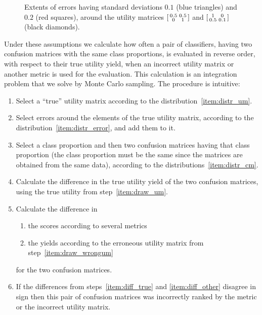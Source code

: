 \documentclass[\ifafour a4paper,12pt,\else a5paper,10pt,\fi%
onecolumn,oneside,article,%
british%
]{memoir}
\theoremstyle{remark}
\theoremstyle{innote}
\renewcommand*{\|}[1][]{\nonscript\:#1\vert\nonscript\:\mathopen{}}
\begin{document}
\begin{figure}[t]
{    \caption{Extents of errors having standard deviations $0.1$ ({\color{mypurpleblue}blue triangles}) and $0.2$ ({\color{myred}red squares}), around the utility matrices $\begin{bsmallmatrix} 0.5&0.5\\0&1 \end{bsmallmatrix}$ and $\begin{bsmallmatrix} 1&0\\0.5&0.1 \end{bsmallmatrix}$ (black diamonds).}
    \label{fig:error_distr_um}}
\end{figure}

Under these assumptions we calculate how often a pair of classifiers, having two confusion matrices with the same class proportions, is evaluated in reverse order, with respect to their true utility yield, when an incorrect utility matrix or another metric is used for the evaluation. This calculation is an integration problem that we solve by Monte Carlo sampling. The procedure is intuitive:
\begin{enumerate}[label=\arabic*.,ref=\arabic*]
\item\label{item:draw_um} Select a \enquote{true} utility matrix according to the distribution~\ref{item:distr_um}.
\item\label{item:draw_wrongum} Select errors around the elements of the true utility matrix, according to the distribution~\ref{item:distr_error}, and add them to it.
\item\label{item:draw_cm} Select a class proportion and then two confusion matrices having that class proportion (the class proportion must be the same since the matrices are obtained from the same data), according to the distributions~\ref{item:distr_cm}.
\item\label{item:diff_true} Calculate the difference in the true utility yield of the two confusion matrices, using the true utility from step~\ref{item:draw_um}.
\item\label{item:diff_other} Calculate the difference in
  \begin{enumerate}[label=\theenumi\alph*.]
  \item the scores according to several metrics
  \item the yields according to the erroneous utility matrix from step~\ref{item:draw_wrongum}
  \end{enumerate}
for the two confusion matrices.
\item If the differences from steps~\ref{item:diff_true} and \ref{item:diff_other} disagree in sign then this pair of confusion matrices was incorrectly ranked by the metric or the incorrect utility matrix.
\end{enumerate}
\end{document}
